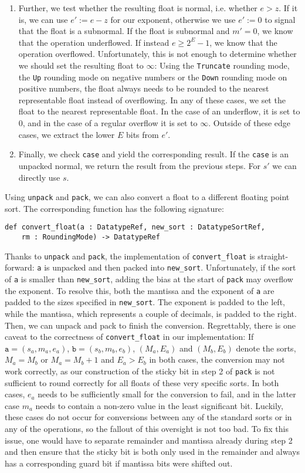 \documentclass[a4paper,UKenglish,cleveref, autoref, thm-restate]{lipics-v2019}
\begin{document}
\begin{enumerate}
	\item Further, we test whether the resulting float is normal, i.e. whether $e > z$. If it is, we can use $e' := e - z$ for our exponent, otherwise we use $e' := 0$ to signal that the float is a subnormal. If the float is subnormal and $m' = 0$, we know that the operation underflowed. If instead $e \geq 2^E - 1$, we know that the operation overflowed. Unfortunately, this is not enough to determine whether we should set the resulting float to $\infty$: Using the \verb|Truncate| rounding mode, the \verb|Up| rounding mode on negative numbers or the \verb|Down| rounding mode on positive numbers, the float always needs to be rounded to the nearest representable float instead of overflowing. In any of these cases, we set the float to the nearest representable float. In the case of an underflow, it is set to $0$, and in the case of a regular overflow it is set to $\infty$. Outside of these edge cases, we extract the lower $E$ bits from $e'$.
	\item Finally, we check \verb|case| and yield the corresponding result. If the \verb|case| is an unpacked normal, we return the result from the previous steps. For $s'$ we can directly use $s$.
\end{enumerate}

Using \verb|unpack| and \verb|pack|, we can also convert a float to a different floating point sort. The corresponding function has the following signature:
\begin{lstlisting}
def convert_float(a : DatatypeRef, new_sort : DatatypeSortRef, 
    rm : RoundingMode) -> DatatypeRef
\end{lstlisting}
Thanks to \verb|unpack| and \verb|pack|, the implementation of \verb|convert_float| is straight-forward: \verb|a| is unpacked and then packed into \verb|new_sort|. Unfortunately, if the sort of \verb|a| is smaller than \verb|new_sort|, adding the bias at the start of \verb|pack| may overflow the exponent. To resolve this, both the mantissa and the exponent of \verb|a| are padded to the sizes specified in \verb|new_sort|. The exponent is padded to the left, while the mantissa, which represents a couple of decimals, is padded to the right.
Then, we can unpack and pack to finish the conversion. Regrettably, there is one caveat to the correctness of \verb|convert_float| in our implementation: If $\texttt{a} = (s_a, m_a, e_a)$, $\texttt{b} = (s_b, m_b, e_b)$, $(M_a, E_a)$ and $(M_b, E_b)$ denote the sorts, $M_a = M_b$ or $M_a = M_b + 1$ and $E_a > E_b$ in both cases, the conversion may not work correctly, as our construction of the sticky bit in step 2 of \verb|pack| is not sufficient to round correctly for all floats of these very specific sorts. In both cases, $e_a$ needs to be sufficiently small for the conversion to fail, and in the latter case $m_a$ needs to contain a non-zero value in the least significant bit. Luckily, these cases do not occur for conversions between any of the standard sorts or in any of the operations, so the fallout of this oversight is not too bad. To fix this issue, one would have to separate remainder and mantissa already during step 2 and then ensure that the sticky bit is both only used in the remainder and always has a corresponding guard bit if mantissa bits were shifted out.
\end{document}
